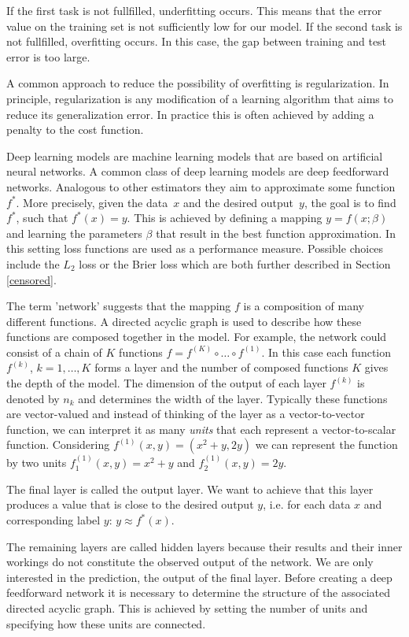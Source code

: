 \documentclass[12pt, a4paper]{scrartcl}
\theoremstyle{definition}
\theoremstyle{plain}
\numberwithin{equation}{section}
\numberwithin{figure}{section}
\numberwithin{table}{section}
\begin{document}
	If the first task is not fullfilled, underfitting occurs. This means that the error value on the training set is not sufficiently low for our model.
	If the second task is not fullfilled, overfitting occurs. In this case, the gap between training and test error is too large.
	
	A common approach to reduce the possibility of overfitting is regularization.
	In principle, regularization is any modification of a learning algorithm that aims to reduce its generalization error.
	In practice this is often achieved by adding a penalty to the cost function.
	
	Deep learning models are machine learning models that are based on artificial neural networks.
	A common class of deep learning models are deep feedforward networks. Analogous to other estimators they aim to approximate some function~$f^*$.
	More precisely, given the data~$x$ and the desired output~$y$, the goal is to find $f^*$, such that $f^*(x)=y$.
	This is achieved by defining a mapping $y = f(x; \beta)$ and learning the parameters $\beta$ that result in the best function approximation.
	In this setting loss functions are used as a performance measure.
	Possible choices include the $L_2$ loss or the Brier loss which are both further described in Section \ref{censored}.
	
	The term 'network' suggests that the mapping $f$ is a composition of many different functions.
	A directed acyclic graph is used to describe how these functions are composed together in the model.
	For example, the network could consist of a chain of $K$ functions $ f = f^{(K)}\circ \dots \circ f^{(1)}$.
	In this case each function~$f^{(k)}$, $k=1,\dots,K$ forms a layer and the number of composed functions $K$ gives the depth of the model.
	The dimension of the output of each layer $f^{(k)}$ is denoted by $n_k$ and determines the width of the layer.
	Typically these functions are vector-valued and instead of thinking of the layer as a vector-to-vector function, we can interpret it as many \emph{units} that each represent a vector-to-scalar function.
	Considering $f^{(1)}(x,y)= (x^2+y,2y)$ we can represent the function by two units $f^{(1)}_1 (x,y) = x^2+y$ and $f^{(1)}_2(x,y) = 2y$.
	
	The final layer is called the output layer.
	We want to achieve that this layer produces a value that is close to the desired output $y$, i.e. for each data $x$ and corresponding label $y$: $y \approx f^*(x)$.
	
	The remaining layers are called hidden layers because their results and their inner workings do not constitute the observed output of the network.
	We are only interested in the prediction, the output of the final layer.
	Before creating a deep feedforward network it is necessary to determine the structure of the associated directed acyclic graph.
	This is achieved by setting the number of units and specifying how these units are connected.
	
\end{document}
